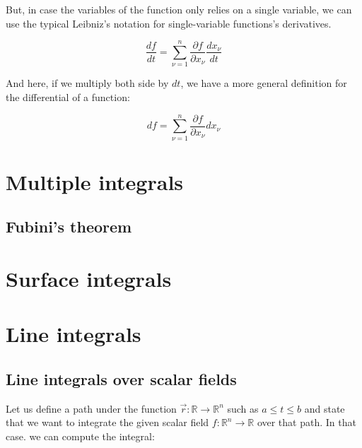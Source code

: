 \documentclass[12pt]{article}
\begin{document}
	But, in case the variables of the function only relies on a single variable, we can use the typical Leibniz's notation for single-variable functions's derivatives.
	
	\[
		\frac{df}{dt}
		= \sum_{\nu = 1}^n \frac{\partial f}{\partial x_\nu} \frac{dx_\nu}{dt}
	\]
	
	And here, if we multiply both side by $dt$, we have a more general definition for the differential of a function:
	
	\[
		df = \sum_{\nu = 1}^n \frac{\partial f}{\partial x_\nu} dx_\nu
	\]
	
	
	\section{Multiple integrals}
	
	\subsection{Fubini's theorem}
	
	
	\section{Surface integrals}

	
	\section{Line integrals}
	
	\subsection{Line integrals over scalar fields}
	
	Let us define a path under the function $\vec{r} : \mathbb{R} \to \mathbb{R}^n$ such as $a \le t \le b$ and state that we want to integrate the given scalar field $f : \mathbb{R}^n \to \mathbb{R}$ over that path. In that case. we can compute the integral:
	
\end{document}

